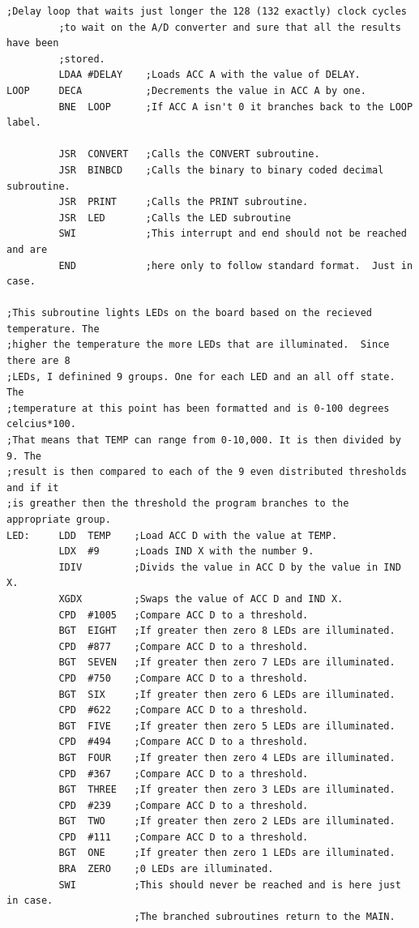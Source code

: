 \documentclass[12pt]{report}
\begin{document}
\begin{Verbatim}[frame=single, fontsize=\small]
         ;Delay loop that waits just longer the 128 (132 exactly) clock cycles
         ;to wait on the A/D converter and sure that all the results have been
         ;stored.
         LDAA #DELAY    ;Loads ACC A with the value of DELAY.
LOOP     DECA           ;Decrements the value in ACC A by one.
         BNE  LOOP      ;If ACC A isn't 0 it branches back to the LOOP label.
         
         JSR  CONVERT   ;Calls the CONVERT subroutine.
         JSR  BINBCD    ;Calls the binary to binary coded decimal subroutine.
         JSR  PRINT     ;Calls the PRINT subroutine.
         JSR  LED       ;Calls the LED subroutine
         SWI            ;This interrupt and end should not be reached and are
         END            ;here only to follow standard format.  Just in case.
         
;This subroutine lights LEDs on the board based on the recieved temperature. The
;higher the temperature the more LEDs that are illuminated.  Since there are 8
;LEDs, I definined 9 groups. One for each LED and an all off state.  The
;temperature at this point has been formatted and is 0-100 degrees celcius*100.
;That means that TEMP can range from 0-10,000. It is then divided by 9. The
;result is then compared to each of the 9 even distributed thresholds and if it
;is greather then the threshold the program branches to the appropriate group.
LED:     LDD  TEMP    ;Load ACC D with the value at TEMP.
         LDX  #9      ;Loads IND X with the number 9.
         IDIV         ;Divids the value in ACC D by the value in IND X.
         XGDX         ;Swaps the value of ACC D and IND X.
         CPD  #1005   ;Compare ACC D to a threshold.
         BGT  EIGHT   ;If greater then zero 8 LEDs are illuminated.
         CPD  #877    ;Compare ACC D to a threshold.
         BGT  SEVEN   ;If greater then zero 7 LEDs are illuminated.
         CPD  #750    ;Compare ACC D to a threshold.
         BGT  SIX     ;If greater then zero 6 LEDs are illuminated.
         CPD  #622    ;Compare ACC D to a threshold.
         BGT  FIVE    ;If greater then zero 5 LEDs are illuminated.
         CPD  #494    ;Compare ACC D to a threshold.
         BGT  FOUR    ;If greater then zero 4 LEDs are illuminated.
         CPD  #367    ;Compare ACC D to a threshold.
         BGT  THREE   ;If greater then zero 3 LEDs are illuminated.
         CPD  #239    ;Compare ACC D to a threshold.
         BGT  TWO     ;If greater then zero 2 LEDs are illuminated.
         CPD  #111    ;Compare ACC D to a threshold.
         BGT  ONE     ;If greater then zero 1 LEDs are illuminated.
         BRA  ZERO    ;0 LEDs are illuminated.
         SWI          ;This should never be reached and is here just in case.
                      ;The branched subroutines return to the MAIN.


\end{Verbatim}
\end{document}
